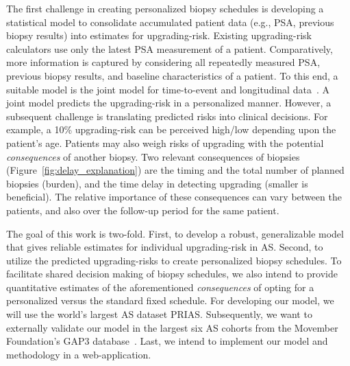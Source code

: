 The first challenge in creating personalized biopsy schedules is developing a statistical model to consolidate accumulated patient data (e.g., PSA, previous biopsy results) into estimates for upgrading-risk. Existing upgrading-risk~\citep{partin1993use,makarov2007updated} calculators use only the latest PSA measurement of a patient. Comparatively, more information is captured by considering all repeatedly measured PSA, previous biopsy results, and baseline characteristics of a patient. To this end, a suitable model is the joint model for time-to-event and longitudinal data~\citep{tomer2019, coley2017prediction,rizopoulos2012joint}. A joint model predicts the upgrading-risk in a personalized manner. However, a subsequent challenge is translating predicted risks into clinical decisions. For example, a 10\% upgrading-risk can be perceived high/low depending upon the patient's age. Patients may also weigh risks of upgrading with the potential \textit{consequences} of another biopsy. Two relevant consequences of biopsies (Figure~\ref{fig:delay_explanation}) are the timing and the total number of planned biopsies (burden), and the time delay in detecting upgrading (smaller is beneficial). The relative importance of these consequences can vary between the patients, and also over the follow-up period for the same patient.

The goal of this work is two-fold. First, to develop a robust, generalizable model that gives reliable estimates for individual upgrading-risk in AS. Second, to utilize the predicted upgrading-risks to create personalized biopsy schedules. To facilitate shared decision making of biopsy schedules, we also intend to provide quantitative estimates of the aforementioned \textit{consequences} of opting for a personalized versus the standard fixed schedule. For developing our model, we will use the world's largest AS dataset PRIAS. Subsequently, we want to externally validate our model in the largest six AS cohorts from the Movember Foundation's GAP3 database~\citep{gap3_2018}. Last, we intend to implement our model and methodology in a web-application.